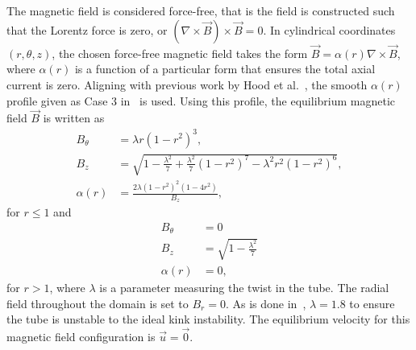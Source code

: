 The magnetic field is considered force-free, that is the field is constructed such that the Lorentz force is zero, or $(\nabla \times \vec{B})\times \vec{B} = 0$. In cylindrical coordinates $(r,\theta,z)$, the chosen force-free magnetic field takes the form $\vec{B} = \alpha(r) \nabla \times \vec{B}$, where $\alpha(r)$ is a function of a particular form that ensures the total axial current is zero. Aligning with previous work by Hood et al.~\cite{hoodCoronalHeatingMagnetic2009}, the smooth $\alpha(r)$ profile given as Case 3 in~\cite{hoodCoronalHeatingMagnetic2009} is used. Using this profile, the equilibrium magnetic field $\vec{B}$ is written as 
\begin{equation}
\begin{aligned}
  \label{eq:field-profile-r-lt-1}
  B_{\theta} &= \lambda r {(1 - r^2)}^3,\\
  B_z &= \sqrt{1 - \frac{\lambda^2}{7} + \frac{\lambda^2}{7}{(1 - r^2)}^7 - \lambda^2 r^2 {(1-r^2)}^6},\\
  \alpha(r) &= \frac{2 \lambda {(1-r^2)}^2 {(1-4r^2)}}{B_z},
\end{aligned}
\end{equation}
for $r \leq 1$ and
\begin{equation}
\begin{aligned}
  \label{eq:field-profile-r-gt-1}
  B_{\theta} &= 0 \\
  B_z &= \sqrt{1 - \frac{\lambda^2}{7}}\\
  \alpha(r) &= 0 ,
\end{aligned}
\end{equation}
for $r > 1$, where $\lambda$ is a parameter measuring the twist in the tube. The radial field throughout the domain is set to $B_r = 0$. As is done in~\cite{hoodCoronalHeatingMagnetic2009}, $\lambda = 1.8$ to ensure the tube is unstable to the ideal kink instability. The equilibrium velocity for this magnetic field configuration is $\vec{u} = \vec{0}$.

